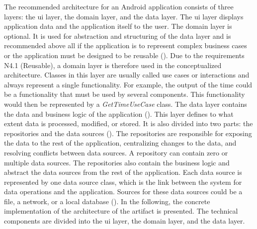 The recommended architecture for an Android application consists of three layers: the \ac{ui} layer, the domain layer, and the data layer. The \ac{ui} layer displays application data and the application itself to the user. The domain layer is optional. It is used for abstraction and structuring of the data layer and is recommended above all if the application is to represent complex business cases or the application must be designed to be reusable (\cite{Google.2023}). Due to the requirements N4.1 (Reusable), a domain layer is therefore used in the conceptualized architecture. Classes in this layer are usually called use cases or interactions and always represent a single functionality. For example, the output of the time could be a functionality that must be used by several components. This functionality would then be represented by a \textit{GetTimeUseCase} class. The data layer contains the data and business logic of the application (\cite{Google.2023}). This layer defines to what extent data is processed, modified, or stored. It is also divided into two parts: the repositories and the data sources (\cite{Google.2023}). The repositories are responsible for exposing the data to the rest of the application, centralizing changes to the data, and resolving conflicts between data sources. A repository can contain zero or multiple data sources. The repositories also contain the business logic and abstract the data sources from the rest of the application. Each data source is represented by one data source class, which is the link between the system for data operations and the application. Sources for these data sources could be a file, a network, or a local database (\cite{Google.2023}).
In the following, the concrete implementation of the architecture of the artifact is presented. The technical components are divided into the \ac{ui} layer, the domain layer, and the data layer.



